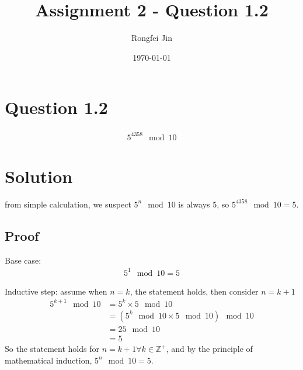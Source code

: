 \documentclass{article}
\author{Rongfei Jin}
\title{Assignment 2 - Question 1.2}
\date{\today}
\begin{document}
\section{Question 1.2}
\begin{align*}
5^{4358} \mod 10
\end{align*}
\section{Solution}

from simple calculation, we suspect $5^n \mod 10$ is always 5, so $5^{4358} \mod 10 = 5$.
\subsection{Proof}

Base case:
\begin{align*}
5^1 \mod 10 = 5
\end{align*}

Inductive step: assume when $n = k$, the statement holds, then consider $n=k+1$
\begin{align*}
5^{k+1} \mod 10 &= 5^k \times 5 \mod 10 \\
&= (5^k \mod 10 \times 5 \mod 10 ) \mod 10\\
&= 25 \mod 10 \\
&= 5
\end{align*}
So the statement holds for $n = k+1 \forall k \in \mathbb{Z^+}$, and by the principle of mathematical induction, $5^n \mod 10 = 5$.
\end{document}
